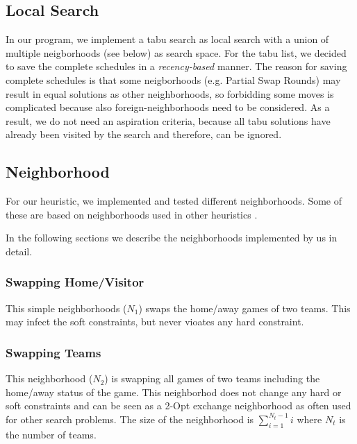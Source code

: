 \documentclass[a4paper,11pt]{article}
\begin{document}
\subsection{Local Search}
In our program, we implement a tabu search as local search with a union of multiple neigborhoods (see below) as search space.
For the tabu list, we decided to save the complete schedules in a \emph{recency-based} manner.
The reason for saving complete schedules is that some neigborhoods (e.g. Partial Swap Rounds) may result in equal solutions as other neighborhoods, so forbidding some moves is complicated because also foreign-neighborhoods need to be considered.
As a result, we do not need an aspiration criteria, because all tabu solutions have already been visited by the search and therefore, can be ignored.

\subsection{Neighborhood}
For our heuristic, we implemented and tested different neighborhoods. Some of these are based on neighborhoods used in other heuristics \cite{Gaspero07,rvk2008, Anagnostopoulos06}.

In the following sections we describe the neighborhoods implemented by us in detail.

\subsubsection{Swapping Home/Visitor}
This simple neighborhoods ($N_1$) swaps the home/away games of two teams. This may infect the soft constraints, but never vioates any hard constraint.

\subsubsection{Swapping Teams}

This neighborhood ($N_2$) is swapping all games of two teams including the home/away status of the game. This neighborhod does not change any hard or soft constraints and
can be seen as a 2-Opt exchange neighborhood as often used for other search problems. The size of the neighborhood is $\sum_{i=1}^{N_t-1}i$ where $N_t$ is the number of teams.
\end{document}

